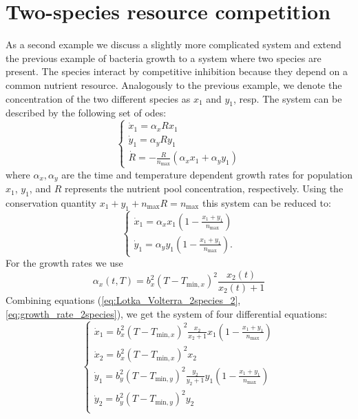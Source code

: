 \documentclass[10pt,A4paper]{article}
\begin{document}
\section*{Two-species resource competition}
As a second example we discuss a slightly more complicated system and extend the previous example of bacteria growth to a system where two species are present.
The species interact by competitive inhibition because they depend on a common nutrient resource. 
Analogously to the previous example, we denote the concentration of the two different species as $x_1$ and $y_1$, resp. 
The system can be described by the following set of \acp{ode}:
\begin{equation}
    \begin{cases}
        \dot x_1 = \alpha_x R x_1 \\
        \dot y_1 = \alpha_y R y_1 \\
        \dot R = -\frac{R}{n_\text{max}}(\alpha_x x_1+\alpha_y y_1)
    \end{cases}
    \label{eq:Lotka_Volterra_2species_1}
\end{equation}
where $\alpha_x, \alpha_y$ are the time and temperature dependent growth rates for population $x_1$, $y_1$, and $R$ represents the nutrient pool concentration, respectively. Using 
the conservation quantity $x_1 + y_1 + n_\text{max}R = n_\text{max}$ this system can be reduced to:
\begin{equation}
    \begin{cases}
        \dot x_1 = \alpha_x x_1\left(1-\frac{x_1+y_1}{n_\text{max}}\right) \\
        \dot y_1 = \alpha_y y_1\left(1-\frac{x_1+y_1}{n_\text{max}}\right).
    \end{cases}
    \label{eq:Lotka_Volterra_2species_2}
\end{equation}
For the growth rates we use \cite{baranyiDynamicApproach1994,?}
\begin{equation}
    \alpha_x (t, T) = b_x^2 (T - T_{\text{min}, x})^2 \frac{x_2(t)}{x_2(t) + 1}
    \label{eq:growth_rate_2species}
\end{equation}
Combining equations (\ref{eq:Lotka_Volterra_2species_2}, \ref{eq:growth_rate_2species}), we get the system of four differential equations:
\begin{equation}
    \begin{cases}
        \dot x_1 = b_x^2 (T - T_{\text{min}, x})^2 \frac{x_2}{x_2 + 1} x_1 (1 - \frac{x_1 + y_1}{n_\text{max}})\\
        \dot x_2 = b_x^2 (T - T_{\text{min}, x})^2 x_2 \\
        \dot y_1 = b_y^2 (T - T_{\text{min}, y})^2 \frac{y_2}{y_2 + 1} y_1 (1 - \frac{x_1 + y_1}{n_\text{max}})\\
        \dot y_2 = b_y^2 (T - T_{\text{min}, y})^2 y_2 \\
    \end{cases}
    \label{eq:model_2species_resource}
\end{equation}
\end{document}
